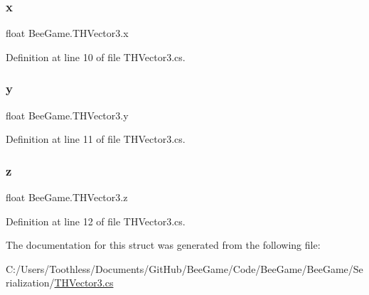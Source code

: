 \subsubsection{\texorpdfstring{x}{x}}
{\footnotesize\ttfamily float Bee\+Game.\+T\+H\+Vector3.\+x}



Definition at line 10 of file T\+H\+Vector3.\+cs.

\mbox{\label{struct_bee_game_1_1_t_h_vector3_a58f88e615565042dbab4e4ba6ab1b3a6}} 
\subsubsection{\texorpdfstring{y}{y}}
{\footnotesize\ttfamily float Bee\+Game.\+T\+H\+Vector3.\+y}



Definition at line 11 of file T\+H\+Vector3.\+cs.

\mbox{\label{struct_bee_game_1_1_t_h_vector3_a56c61f039a2cdabc8a371d2faa9838fa}} 
\subsubsection{\texorpdfstring{z}{z}}
{\footnotesize\ttfamily float Bee\+Game.\+T\+H\+Vector3.\+z}



Definition at line 12 of file T\+H\+Vector3.\+cs.



The documentation for this struct was generated from the following file\+:\begin{DoxyCompactItemize}
\item 
C\+:/\+Users/\+Toothless/\+Documents/\+Git\+Hub/\+Bee\+Game/\+Code/\+Bee\+Game/\+Bee\+Game/\+Serialization/\hyperlink{_t_h_vector3_8cs}{T\+H\+Vector3.\+cs}\end{DoxyCompactItemize}
